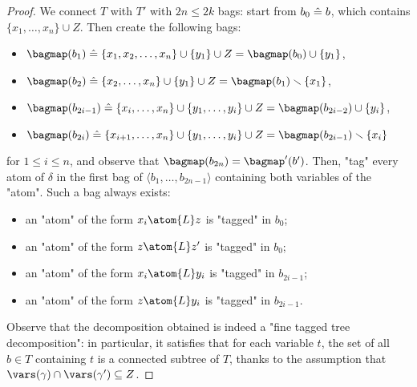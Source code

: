 \begin{proof}
   	We connect $T$ with $T'$ with $2n \leq 2k$ bags:
    start from $b_0 \mathrel{\hat{=}} b$, which contains $\{x_1,\hdots,x_n\}\cup Z$. Then create
    the following bags:
    \begin{itemize}
        \item $\bagmap(b_1) \defeq \{x_1,x_2,\hdots,x_n\}\cup\{y_1\}\cup Z
            = \bagmap(b_0) \cup \{y_1\}$, 
        \item $\bagmap(b_2) \defeq \{x_2,\hdots,x_n\}\cup\{y_1\}\cup Z
            = \bagmap(b_1) \smallsetminus \{x_1\}$,
        \item $\bagmap(b_{2i-1}) \defeq \{x_i,\hdots,x_n\}\cup\{y_1,\hdots,y_i\}\cup Z
            = \bagmap(b_{2i-2}) \cup \{y_i\}$,
        \item $\bagmap(b_{2i}) \defeq \{x_{i+1},\hdots,x_n\}\cup\{y_1,\hdots,y_i\}\cup Z
            = \bagmap(b_{2i-1}) \smallsetminus \{x_i\}$
    \end{itemize}
    for $1 \leq i \leq n$, and observe that $\bagmap(b_{2n}) = \bagmap'(b')$.
    Then, "tag" every atom of $\delta$ in the first bag of
	$\langle b_1, \hdots, b_{2n-1} \rangle$ containing both variables of the "atom".
	Such a bag always exists:
	\begin{itemize}
		\item an "atom" of the form $x_i \atom{L} z$ is "tagged" in $b_0$;
		\item an "atom" of the form $z \atom{L} z'$ is "tagged" in $b_0$;
		\item an "atom" of the form $x_i \atom{L} y_i$ is "tagged" in $b_{2i-1}$;
		\item an "atom" of the form $z \atom{L} y_i$ is "tagged" in $b_{2i-1}$.
	\end{itemize}
	Observe that the decomposition obtained is indeed a "fine tagged tree decomposition":
	in particular, it satisfies that for each variable $t$, the set of all $b \in T$
	containing $t$ is a connected subtree of $T$, thanks to the assumption that
	$\vars(\gamma) \cap \vars(\gamma') \subseteq Z$.
\end{proof} 